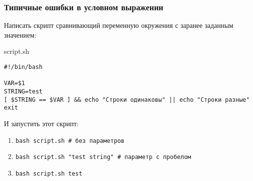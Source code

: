 \begin{frame}[fragile]
\frametitle{Типичные ошибки в условном выражении}

	Написать скрипт сравнивающий переменную окружения с заранее заданным значением:
	
	\begin{block}{script.sh}
	\small\begin{lstlisting}
#!/bin/bash

VAR=$1
STRING=test
[ $STRING == $VAR ] && echo "Строки одинаковы" || echo "Строки разные"
exit
	\end{lstlisting}
    \end{block}
    \normalsize
	И запустить этот скрипт:
	
	\begin{enumerate}
	\item {\tt bash script.sh \# без параметров}
	\item {\tt bash script.sh "test string" \# параметр с пробелом}
	\item {\tt bash script.sh test}
        \end{enumerate}

\end{frame}
